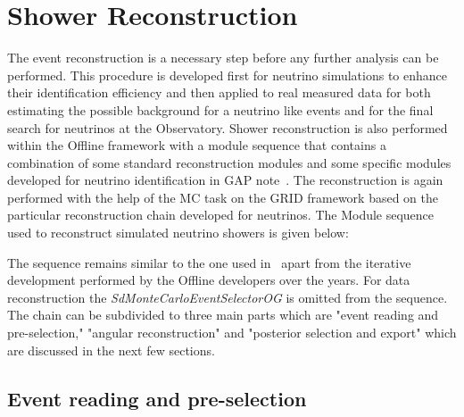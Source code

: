 \section{Shower Reconstruction}
\label{sec:reco}

The event reconstruction is a necessary step before any further analysis can be performed. This procedure is developed first for neutrino simulations to enhance their identification efficiency and then applied to real measured data for both estimating the possible background for a neutrino like events and for the final search for neutrinos at the Observatory. Shower reconstruction is also performed within the Offline framework with a module sequence that contains a combination of some standard reconstruction modules and some specific modules developed for neutrino identification in GAP note~\cite{}. The reconstruction is again performed with the help of the MC task on the GRID framework based on the particular reconstruction chain developed for neutrinos. The Module sequence used to reconstruct simulated neutrino showers is given below:


The sequence remains similar to the one used in~\cite{} apart from the iterative development performed by the Offline developers over the years. For data reconstruction the \textit{SdMonteCarloEventSelectorOG} is omitted from the sequence. The chain can be subdivided to three main parts which are "event reading and pre-selection," "angular reconstruction" and "posterior selection and export" which are discussed in the next few sections.

\subsection{Event reading and pre-selection}
\label{subsec:reco_presel}

